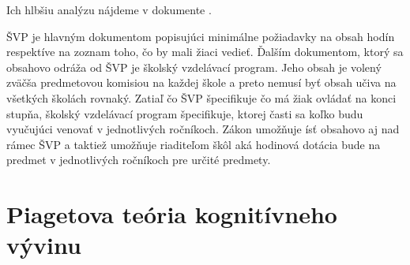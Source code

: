Ich hlbšiu analýzu nájdeme v dokumente \cite{ISCED2}.


ŠVP je hlavným dokumentom popisujúci minimálne požiadavky na obsah hodín respektíve na zoznam toho, čo by mali žiaci vedieť.
Ďalším dokumentom, ktorý sa obsahovo odráža od ŠVP je školský vzdelávací program.
Jeho obsah je volený zväčša predmetovou komisiou na každej škole a preto nemusí byť obsah učiva na všetkých školách rovnaký.
Zatiaľ čo ŠVP špecifikuje čo má žiak ovládať na konci stupňa, školský vzdelávací program špecifikuje, ktorej časti sa koľko budu vyučujúci venovať v jednotlivých ročníkoch.
Zákon umožňuje ísť obsahovo aj nad rámec ŠVP a taktiež umožňuje riaditeľom škôl aká hodinová dotácia bude na predmet v jednotlivých ročníkoch pre určité predmety.

\section{Piagetova teória kognitívneho vývinu} \label{piaget}

